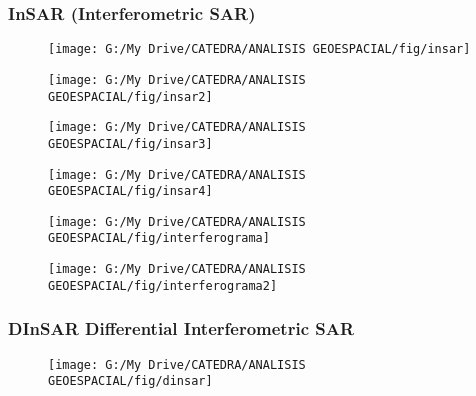 \documentclass[14pt]{beamer}
\begin{document}
\begin{frame}
\frametitle{InSAR (Interferometric SAR)
}
 \begin{figure}
    \centering
    \texttt{[image: G:/My Drive/CATEDRA/ANALISIS GEOESPACIAL/fig/insar]}
  \end{figure}
\end{frame}
\begin{frame}
 \begin{figure}
    \centering
    \texttt{[image: G:/My Drive/CATEDRA/ANALISIS GEOESPACIAL/fig/insar2]}
  \end{figure}
\end{frame}
\begin{frame}
 \begin{figure}
    \centering
    \texttt{[image: G:/My Drive/CATEDRA/ANALISIS GEOESPACIAL/fig/insar3]}
  \end{figure}
\end{frame}
\begin{frame}
 \begin{figure}
    \centering
    \texttt{[image: G:/My Drive/CATEDRA/ANALISIS GEOESPACIAL/fig/insar4]}
  \end{figure}
\end{frame}
\begin{frame}
 \begin{figure}
    \centering
    \texttt{[image: G:/My Drive/CATEDRA/ANALISIS GEOESPACIAL/fig/interferograma]}
  \end{figure}
\end{frame}
\begin{frame}
 \begin{figure}
    \centering
    \texttt{[image: G:/My Drive/CATEDRA/ANALISIS GEOESPACIAL/fig/interferograma2]}
  \end{figure}
\end{frame}
\begin{frame}
\frametitle{DInSAR Differential Interferometric SAR}
 \begin{figure}
    \centering
    \texttt{[image: G:/My Drive/CATEDRA/ANALISIS GEOESPACIAL/fig/dinsar]}
  \end{figure}
\end{frame}
\end{document}
